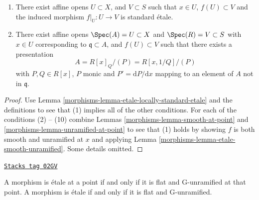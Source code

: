 \begin{lemma}
\begin{enumerate}
$$\left(
\begin{matrix}
\partial f_1/\partial x_1 &
\partial f_2/\partial x_1 &
\ldots &
\partial f_n/\partial x_1 \\
\partial f_1/\partial x_2 &
\partial f_2/\partial x_2 &
\ldots &
\partial f_n/\partial x_2 \\
\ldots & \ldots & \ldots & \ldots \\
\partial f_1/\partial x_n &
\partial f_2/\partial x_n &
\ldots &
\partial f_n/\partial x_n
\end{matrix}
\right)
$$
mapping to an element of $A$ not in $\mathfrak q$.
\item There exist affine opens $U \subset X$,
and $V \subset S$ such that $x \in U$, $f(U) \subset V$ and the
induced morphism $f|_U : U \to V$ is standard \'etale.
\item There exist affine opens $\Spec(A) = U \subset X$
and $\Spec(R) = V \subset S$ with $x \in U$ corresponding
to $\mathfrak q \subset A$, and $f(U) \subset V$
such that there exists a presentation
$$
A = R[x]_Q/(P) = R[x, 1/Q]/(P)
$$
with $P, Q \in R[x]$, $P$ monic and $P' = \text{d}P/\text{d}x$ mapping to
an element of $A$ not in $\mathfrak q$.
\end{enumerate}
\end{lemma}

\begin{proof}

Use Lemma \ref{morphisms-lemma-etale-locally-standard-etale}
and the definitions to see that (1) implies all
of the other conditions. For each of the conditions
(2) -- (10) combine Lemmas \ref{morphisms-lemma-smooth-at-point}
and \ref{morphisms-lemma-unramified-at-point} to see
that (1) holds by showing $f$ is both smooth and unramified
at $x$ and applying Lemma \ref{morphisms-lemma-etale-smooth-unramified}.
Some details omitted.
\end{proof}

\begin{lemma}
\label{morphisms-lemma-flat-unramified-etale}
\href{https://stacks.math.columbia.edu/tag/02GV}{\texttt{Stacks tag 02GV}}

A morphism is \'etale at a point if and only if it is flat and G-unramified
at that point.
A morphism is \'etale if and only if it is flat and G-unramified.
\end{lemma}

